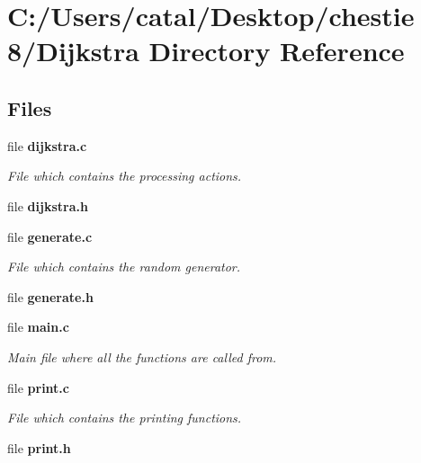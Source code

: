\section{C\+:/\+Users/catal/\+Desktop/chestie 8/\+Dijkstra Directory Reference}
\label{dir_3ab9bbdaffb79e70d0e85b9aaf2008c8}
\subsection*{Files}
\begin{DoxyCompactItemize}
\item 
file \textbf{ dijkstra.\+c}
\begin{DoxyCompactList}\small\item\em File which contains the processing actions. \end{DoxyCompactList}\item 
file \textbf{ dijkstra.\+h}
\item 
file \textbf{ generate.\+c}
\begin{DoxyCompactList}\small\item\em File which contains the random generator. \end{DoxyCompactList}\item 
file \textbf{ generate.\+h}
\item 
file \textbf{ main.\+c}
\begin{DoxyCompactList}\small\item\em Main file where all the functions are called from. \end{DoxyCompactList}\item 
file \textbf{ print.\+c}
\begin{DoxyCompactList}\small\item\em File which contains the printing functions. \end{DoxyCompactList}\item 
file \textbf{ print.\+h}
\end{DoxyCompactItemize}
